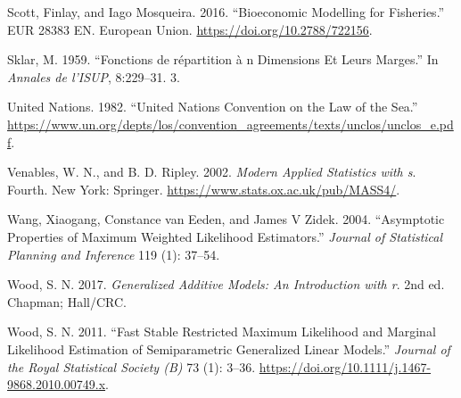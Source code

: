 \documentclass[
]{book}
\newlength{\cslhangindent}
\newlength{\cslentryspacingunit} %
\newenvironment{CSLReferences}[2] %
 {%
  \setlength{\parindent}{0pt}
  \ifodd #1
  \let\oldpar\par
  \def\par{\hangindent=\cslhangindent\oldpar}
  \fi
  \setlength{\parskip}{#2\cslentryspacingunit}
 }%
 {}
\begin{document}
\begin{CSLReferences}{1}{0}
\leavevmode{}%
Scott, Finlay, and Iago Mosqueira. 2016. {``Bioeconomic Modelling for Fisheries.''} EUR 28383 EN. European Union. \url{https://doi.org/10.2788/722156}.

\leavevmode{}%
Sklar, M. 1959. {``Fonctions de r{é}partition {à} n Dimensions Et Leurs Marges.''} In \emph{Annales de l'ISUP}, 8:229--31. 3.

\leavevmode{}%
United Nations. 1982. {``United Nations Convention on the Law of the Sea.''} \url{https://www.un.org/depts/los/convention_agreements/texts/unclos/unclos_e.pdf}.

\leavevmode{}%
Venables, W. N., and B. D. Ripley. 2002. \emph{Modern Applied Statistics with s}. Fourth. New York: Springer. \url{https://www.stats.ox.ac.uk/pub/MASS4/}.

\leavevmode{}%
Wang, Xiaogang, Constance van Eeden, and James V Zidek. 2004. {``Asymptotic Properties of Maximum Weighted Likelihood Estimators.''} \emph{Journal of Statistical Planning and Inference} 119 (1): 37--54.

\leavevmode{}%
Wood, S. N. 2017. \emph{Generalized Additive Models: An Introduction with r}. 2nd ed. Chapman; Hall/CRC.

\leavevmode{}%
Wood, S. N. 2011. {``Fast Stable Restricted Maximum Likelihood and Marginal Likelihood Estimation of Semiparametric Generalized Linear Models.''} \emph{Journal of the Royal Statistical Society (B)} 73 (1): 3--36. \url{https://doi.org/10.1111/j.1467-9868.2010.00749.x}.

\end{CSLReferences}
\end{document}

